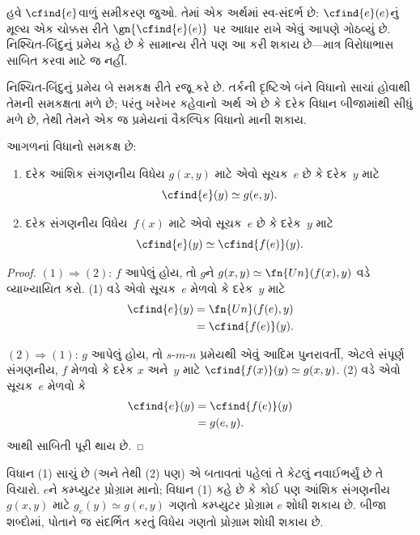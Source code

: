 હવે $\cfind{e}$વાળું સમીકરણ જુઓ. તેમાં એક અર્થમાં
સ્વ-સંદર્ભ છે: $\cfind{e}(e)$નું મૂલ્ય એક ચોક્કસ રીતે
$\gn{\cfind{e}(e)}$ પર આધાર રાખે એવું આપણે ગોઠવ્યું છે.
નિશ્ચિત-બિંદુનું પ્રમેય કહે છે કે સામાન્ય રીતે પણ આ કરી
શકાય છે---માત્ર વિરોધાભાસ સાબિત કરવા માટે જ નહીં.

 નિશ્ચિત-બિંદુનું પ્રમેય બે સમકક્ષ
રીતે રજૂ કરે છે. તર્કની દૃષ્ટિએ બંને વિધાનો સાચાં હોવાથી
તેમની સમકક્ષતા મળે છે; પરંતુ ખરેખર કહેવાનો અર્થ એ છે કે
દરેક વિધાન બીજામાંથી સીધું મળે છે, તેથી તેમને એક જ પ્રમેયનાં
વૈકલ્પિક વિધાનો માની શકાય.

\begin{lem}
આગળનાં વિધાનો સમકક્ષ છે:
\begin{enumerate}
\item દરેક આંશિક સંગણનીય વિધેય $g(x,y)$ માટે એવો
  સૂચક~$e$ છે કે દરેક~$y$ માટે
\[
\cfind{e}(y) \simeq g(e,y).
\]
\item દરેક સંગણનીય વિધેય~$f(x)$ માટે એવો સૂચક~$e$
  છે કે દરેક~$y$ માટે
\[
\cfind{e}(y) \simeq \cfind{f(e)}(y).
\]
\end{enumerate}
\end{lem}

\begin{proof}
$(1) \Rightarrow (2)$: $f$ આપેલું હોય, તો $g$ને
$g(x,y) \simeq \fn{Un}(f(x),y)$ વડે વ્યાખ્યાયિત કરો.
(1) વડે એવો સૂચક~$e$ મેળવો કે દરેક~$y$ માટે
\begin{align*}
\cfind{e}(y) & = \fn{Un}(f(e),y) \\
& = \cfind{f(e)}(y).
\end{align*}

$(2) \Rightarrow (1)$: $g$ આપેલું હોય, તો $s$-$m$-$n$
પ્રમેયથી એવું આદિમ પુનરાવર્તી, એટલે સંપૂર્ણ સંગણનીય, $f$ મેળવો
કે દરેક $x$ અને~$y$ માટે
$\cfind{f(x)}(y) \simeq g(x,y)$. (2) વડે એવો સૂચક~$e$
મેળવો કે
\begin{align*}
\cfind{e}(y) & = \cfind{f(e)}(y) \\
& = g(e,y).
\end{align*}
આથી સાબિતી પૂરી થાય છે.
\end{proof}

\begin{explain}
વિધાન (1) સાચું છે (અને તેથી (2) પણ) એ બતાવતાં પહેલાં
તે કેટલું નવાઈભર્યું છે તે વિચારો. $e$ને કમ્પ્યુટર પ્રોગ્રામ
માનો; વિધાન (1) કહે છે કે કોઈ પણ આંશિક સંગણનીય
$g(x,y)$ માટે $g_e(y) \simeq g(e,y)$ ગણતો કમ્પ્યુટર
પ્રોગ્રામ $e$ શોધી શકાય છે. બીજા શબ્દોમાં, પોતાને જ
સંદર્ભિત કરતું વિધેય ગણતો પ્રોગ્રામ શોધી શકાય છે.
\end{explain}

